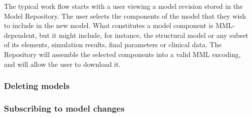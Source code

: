 The typical work flow starts with a user viewing a model revision stored in the \ddmore Model Repository. The user selects the components of the model that they wish to include in the new model. What constitutes a model component is MML-dependent, but it might include, for instance, the structural model or any subset of its elements, simulation results, final parameters or clinical data. The Repository will assemble the selected components into a valid MML encoding, and will allow the user to download it. 

\subsubsection{Deleting models}

\subsubsection{Subscribing to model changes}

